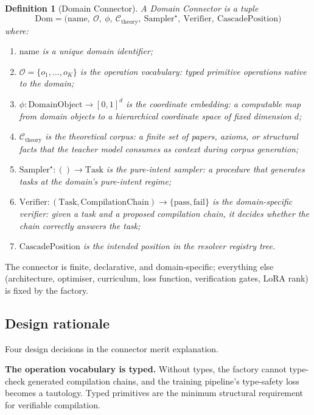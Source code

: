 \documentclass[twocolumn,11pt,a4paper]{article}
\newtheorem{definition}[theorem]{Definition}
\newcommand{\cO}{\mathcal{O}}
\newcommand{\cC}{\mathcal{C}}
\begin{document}
\begin{definition}[Domain Connector]
\label{def:connector}
A \emph{Domain Connector} is a tuple
\begin{equation}
\mathrm{Dom} = \bigl(\mathrm{name},\ \cO,\ \phi,\ \cC_{\mathrm{theory}},\ \mathrm{Sampler}^\star,\ \mathrm{Verifier},\ \mathrm{CascadePosition}\bigr)
\end{equation}
where:
\begin{enumerate}[leftmargin=*,itemsep=1pt]
\item $\mathrm{name}$ is a unique domain identifier;
\item $\cO = \{o_1, \ldots, o_K\}$ is the operation vocabulary: typed primitive operations native to the domain;
\item $\phi: \mathrm{DomainObject} \to [0,1]^d$ is the coordinate embedding: a computable map from domain objects to a hierarchical coordinate space of fixed dimension $d$;
\item $\cC_{\mathrm{theory}}$ is the theoretical corpus: a finite set of papers, axioms, or structural facts that the teacher model consumes as context during corpus generation;
\item $\mathrm{Sampler}^\star: () \to \mathrm{Task}$ is the pure-intent sampler: a procedure that generates tasks at the domain's pure-intent regime;
\item $\mathrm{Verifier}: (\mathrm{Task}, \mathrm{CompilationChain}) \to \{\mathrm{pass}, \mathrm{fail}\}$ is the domain-specific verifier: given a task and a proposed compilation chain, it decides whether the chain correctly answers the task;
\item $\mathrm{CascadePosition}$ is the intended position in the resolver registry tree.
\end{enumerate}
\end{definition}

The connector is finite, declarative, and domain-specific; everything else (architecture, optimiser, curriculum, loss function, verification gates, LoRA rank) is fixed by the factory.

\subsection{Design rationale}

Four design decisions in the connector merit explanation.

\textbf{The operation vocabulary is typed.} Without types, the factory cannot type-check generated compilation chains, and the training pipeline's type-safety loss becomes a tautology. Typed primitives are the minimum structural requirement for verifiable compilation.
\end{document}
